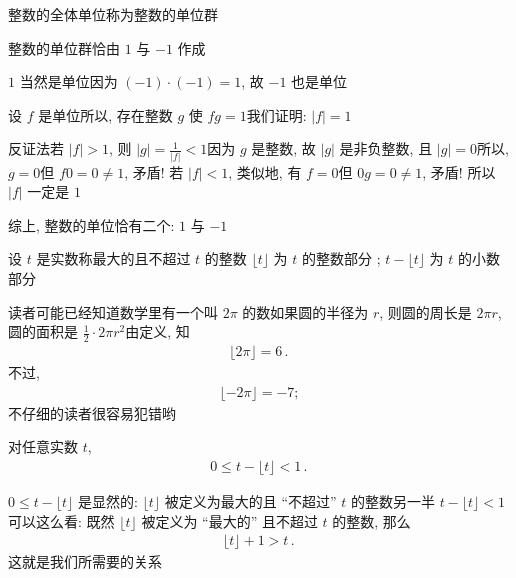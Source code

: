 \begin{definition}
    整数的全体单位称为整数的单位群\period
\end{definition}

\begin{proposition}
    整数的单位群恰由 $1$ 与 $-1$ 作成\period
\end{proposition}

\begin{pf}
    $1$ 当然是单位\period 因为 $(-1) \cdot (-1) = 1$, 故 $-1$ 也是单位\period

    设 $f$ 是单位\period 所以, 存在整数 $g$ 使 $fg = 1$\period 我们证明: $|f| = 1$\period

    反证法\period 若 $|f| > 1$, 则 $|g| = \frac{1}{|f|} < 1$\period 因为 $g$ 是整数, 故 $|g|$ 是非负整数, 且 $|g| = 0$\period 所以, $g = 0$\period 但 $f0 = 0 \neq 1$, 矛盾! 若 $|f| < 1$, 类似地, 有 $f = 0$\period 但 $0g = 0 \neq 1$, 矛盾! 所以 $|f|$ 一定是 $1$\period

    综上, 整数的单位恰有二个: $1$ 与 $-1$\period
\end{pf}

\begin{definition}
    设 $t$ 是实数\period 称最大的且不超过 $t$ 的整数 $\lfloor t \rfloor$ 为 $t$ 的整数部分 ; $t - \lfloor t \rfloor$ 为 $t$ 的小数部分 \period
\end{definition}

\begin{example}
    读者可能已经知道数学里有一个叫 $2\pi$ 的数\period 如果圆的半径为 $r$, 则圆的周长是 $2\pi r$, 圆的面积是 $\frac12 \cdot 2\pi r^2$\period 由定义, 知
    \begin{align*}
        \lfloor 2\pi \rfloor = 6 \period
    \end{align*}
    不过,
    \begin{align*}
        \lfloor -2\pi \rfloor = -7;
    \end{align*}
    不仔细的读者很容易犯错哟\period
\end{example}

\begin{proposition}
    对任意实数 $t$,
    \begin{align*}
        0 \leq t - \lfloor t \rfloor < 1 \period
    \end{align*}
\end{proposition}

\begin{pf}
    $0 \leq t - \lfloor t \rfloor$ 是显然的: $\lfloor t \rfloor$ 被定义为最大的且 ``不超过'' $t$ 的整数\period 另一半 $t - \lfloor t \rfloor < 1$ 可以这么看: 既然 $\lfloor t \rfloor$ 被定义为 ``最大的'' 且不超过 $t$ 的整数, 那么
    \begin{align*}
        \lfloor t \rfloor + 1 > t \period
    \end{align*}
    这就是我们所需要的关系\period
\end{pf}

